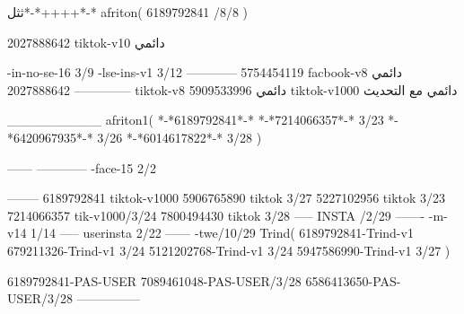 ثثل*-*++++*-*
afriton(
6189792841 /8/8
)

2027888642 tiktok-v10
دائمي

-in-no-se-16 3/9
-lse-ins-v1 3/12
------------
5754454119 facbook-v8
دائمي
--------------
2027888642 tiktok-v8
دائمي
5909533996 tiktok-v1000
دائمي مع التحديث

__________
afriton1(
*-*6189792841*-*
*-*7214066357*-* 3/23
*-*6420967935*-* 3/26
*-*6014617822*-* 3/28
)


------
------------
-face-15 2/2

--------
6189792841 tiktok-v1000
5906765890 tiktok 3/27
5227102956 tiktok 3/23
7214066357 tik-v1000/3/24
7800494430 tiktok 3/28
-----
 INSTA /2/29
-------
-m-v14 1/14
-----
userinsta 2/22
------
-twe/10/29
Trind(
6189792841-Trind-v1 
679211326-Trind-v1 3/24
5121202768-Trind-v1 3/24
5947586990-Trind-v1 3/27
)

6189792841-PAS-USER
7089461048-PAS-USER/3/28
6586413650-PAS-USER/3/28
    ---------------
